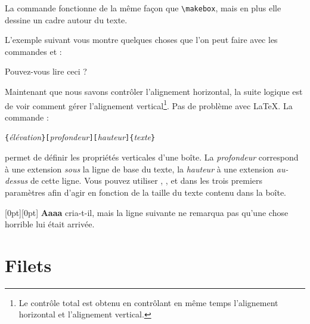 La commande  fonctionne de la même façon que
\verb|\makebox|, mais en plus elle dessine un cadre autour du texte. 

L'exemple suivant vous montre quelques choses que l'on peut faire avec
les commandes  et  :

\begin{example}
\par
{}\par
{} \par
{} \par
{} 
Pouvez-vous lire ceci ?
\end{example}

Maintenant que nous savons contrôler l'alignement horizontal, la suite
logique est de voir comment gérer l'alignement vertical\footnote{Le
contrôle total est obtenu en contrôlant en même temps l'alignement
horizontal et l'alignement vertical.}. Pas de problème avec
\LaTeX{}. La commande :

\begin{lscommand}
\verb|{|\emph{élévation}\verb|}[|\emph{profondeur}\verb|][|\emph{hauteur}\verb|]{|\emph{texte}\verb|}|
\end{lscommand}

\noindent permet de définir les propriétés verticales d'une boîte. La
\emph{profondeur} correspond à une extension \emph{sous} la ligne de
base du texte, la \emph{hauteur} à une extension \emph{au-dessus} de
cette ligne. Vous pouvez utiliser , , 
et  dans les trois premiers paramètres afin d'agir en
fonction de la taille du texte contenu dans la boîte.

\begin{example}
\raisebox{0pt}[0pt][0pt]{\Large%
\textbf{Aaaa\raisebox{-0.3ex}{a}%
\raisebox{-0.7ex}{aa}%
\raisebox{-1.2ex}{r}%
\raisebox{-2.2ex}{g}%
\raisebox{-4.5ex}{h}}}
cria-t-il, mais la ligne suivante
ne remarqua pas qu'une chose
horrible lui était arrivée.
\end{example}

\section{Filets}
\label{sec:rule}

